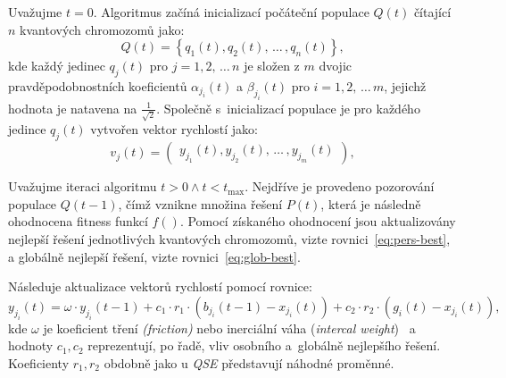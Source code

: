 Uvažujme $t=0$. Algoritmus začíná inicializací počáteční populace $Q\left(t\right)$ čítající $n$ kvantových chromozomů jako: 
\begin{equation*}
    Q\left(t\right) = \left\{q_1\left(t\right), q_2\left(t\right),\,\dots\,,q_n\left(t\right)\right\},
\end{equation*}
kde každý jedinec $q_j\left(t\right)$ pro $j=1,2,\,\dots\,n$ je složen z $m$ dvojic pravděpodobnostních koeficientů $\alpha_{j_i}\left(t\right)$ a $\beta_{j_i}\left(t\right)$ pro $i=1,2,\,\dots\,m$, jejichž hodnota je natavena na $\frac{1}{\sqrt{2}}$.
Společně s~inicializací populace je pro každého jedince $q_j\left(t\right)$ vytvořen vektor rychlostí jako:
\begin{equation*}
    v_j\left(t\right) = \begin{pmatrix} y_{j_1}\left(t\right), y_{j_2}\left(t\right),\,\dots\,, y_{j_m}\left(t\right) \end{pmatrix},
\end{equation*}

Uvažujme iteraci algoritmu $t>0 \wedge t<t_{\text{max}}$. 
Nejdříve je provedeno pozorování populace $Q\left(t-1\right)$, čímž vznikne množina řešení $P\left(t\right)$, která je následně ohodnocena fitness funkcí $f\left(\right)$. 
Pomocí získaného ohodnocení jsou aktualizovány nejlepší řešení jednotlivých kvantových chromozomů, vizte rovnici~\ref{eq:pers-best}, a globálně nejlepší řešení, vizte rovnici~\ref{eq:glob-best}. 

Následuje aktualizace vektorů rychlostí pomocí rovnice:
\begin{equation*}
    y_{j_i}\left(t\right) = \omega \cdot y_{j_i}\left(t-1\right) + c_1 \cdot r_1 \cdot (b_{j_i}\left(t-1\right) - x_{j_i}\left(t\right)) + c_2 \cdot r_2 \cdot (g_i\left(t\right) - x_{j_i}\left(t\right)),
\end{equation*}
kde $\omega$ je koeficient tření \emph{(friction)} nebo inerciální váha (\emph{intercal weight})~\cite{PSO-c1c2w} a hodnoty $c_1,c_2$ reprezentují, po řadě, vliv osobního a~globálně nejlepšího řešení. 
Koeficienty $r_1, r_2$ obdobně jako u \emph{QSE} představují náhodné proměnné. 

